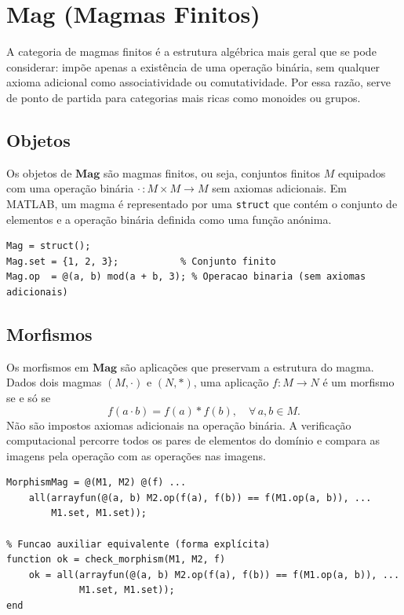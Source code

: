 \section{Mag (Magmas Finitos)}
A categoria de magmas finitos é a estrutura algébrica mais geral que se pode considerar: impõe apenas a existência de uma operação binária, sem qualquer axioma adicional como associatividade ou comutatividade. Por essa razão, serve de ponto de partida para categorias mais ricas como monoides ou grupos.

\subsection{Objetos}
Os objetos de $\mathbf{Mag}$ são magmas finitos, ou seja, conjuntos finitos $M$ equipados com uma operação binária $\cdot\,: M \times M \to M$ sem axiomas adicionais. Em MATLAB, um magma é representado por uma \texttt{struct} que contém o conjunto de elementos e a operação binária definida como uma função anónima.

\begin{lstlisting}[caption={Representação de um magma finito}]
% Definicao de um magma: conjunto {1,2,3} com operacao mod 3
Mag = struct();
Mag.set = {1, 2, 3};           % Conjunto finito
Mag.op  = @(a, b) mod(a + b, 3); % Operacao binaria (sem axiomas adicionais)
\end{lstlisting}

\subsection{Morfismos}
Os morfismos em $\mathbf{Mag}$ são aplicações que preservam a estrutura do magma. Dados dois magmas $(M, \cdot)$ e $(N, \ast)$, uma aplicação $f: M \to N$ é um morfismo se e só se
\[
    f(a \cdot b) = f(a) \ast f(b), \quad \forall\, a, b \in M.
\]
Não são impostos axiomas adicionais na operação binária. A verificação computacional percorre todos os pares de elementos do domínio e compara as imagens pela operação com as operações nas imagens.

\begin{lstlisting}[caption={Verificação de morfismo entre magmas}]
% Construtor de verificador de morfismo entre dois magmas M1 e M2
MorphismMag = @(M1, M2) @(f) ...
    all(arrayfun(@(a, b) M2.op(f(a), f(b)) == f(M1.op(a, b)), ...
        M1.set, M1.set));

% Funcao auxiliar equivalente (forma explícita)
function ok = check_morphism(M1, M2, f)
    ok = all(arrayfun(@(a, b) M2.op(f(a), f(b)) == f(M1.op(a, b)), ...
             M1.set, M1.set));
end
\end{lstlisting}
